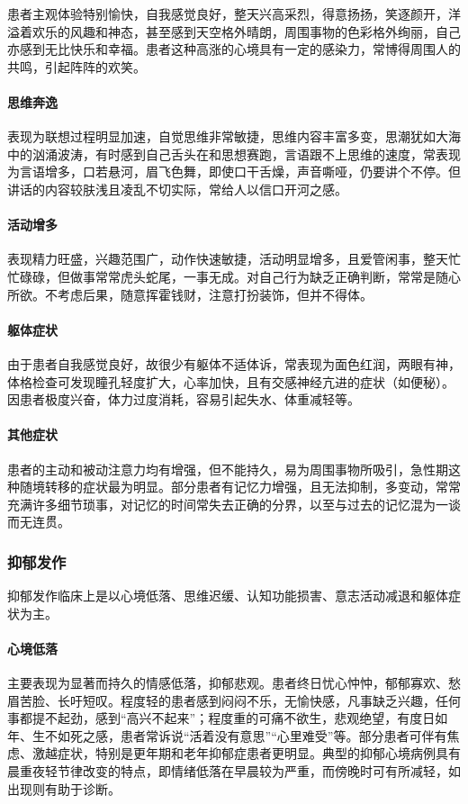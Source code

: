 患者主观体验特别愉快，自我感觉良好，整天兴高采烈，得意扬扬，笑逐颜开，洋溢着欢乐的风趣和神态，甚至感到天空格外晴朗，周围事物的色彩格外绚丽，自己亦感到无比快乐和幸福。患者这种高涨的心境具有一定的感染力，常博得周围人的共鸣，引起阵阵的欢笑。
\paragraph{思维奔逸}

表现为联想过程明显加速，自觉思维非常敏捷，思维内容丰富多变，思潮犹如大海中的汹涌波涛，有时感到自己舌头在和思想赛跑，言语跟不上思维的速度，常表现为言语增多，口若悬河，眉飞色舞，即使口干舌燥，声音嘶哑，仍要讲个不停。但讲话的内容较肤浅且凌乱不切实际，常给人以信口开河之感。
\paragraph{活动增多}

表现精力旺盛，兴趣范围广，动作快速敏捷，活动明显增多，且爱管闲事，整天忙忙碌碌，但做事常常虎头蛇尾，一事无成。对自己行为缺乏正确判断，常常是随心所欲。不考虑后果，随意挥霍钱财，注意打扮装饰，但并不得体。
\paragraph{躯体症状}

由于患者自我感觉良好，故很少有躯体不适体诉，常表现为面色红润，两眼有神，体格检查可发现瞳孔轻度扩大，心率加快，且有交感神经亢进的症状（如便秘）。因患者极度兴奋，体力过度消耗，容易引起失水、体重减轻等。
\paragraph{其他症状}

患者的主动和被动注意力均有增强，但不能持久，易为周围事物所吸引，急性期这种随境转移的症状最为明显。部分患者有记忆力增强，且无法抑制，多变动，常常充满许多细节琐事，对记忆的时间常失去正确的分界，以至与过去的记忆混为一谈而无连贯。

\subsubsection{抑郁发作}

抑郁发作临床上是以心境低落、思维迟缓、认知功能损害、意志活动减退和躯体症状为主。
\paragraph{心境低落}

主要表现为显著而持久的情感低落，抑郁悲观。患者终日忧心忡忡，郁郁寡欢、愁眉苦脸、长吁短叹。程度轻的患者感到闷闷不乐，无愉快感，凡事缺乏兴趣，任何事都提不起劲，感到“高兴不起来”；程度重的可痛不欲生，悲观绝望，有度日如年、生不如死之感，患者常诉说“活着没有意思”“心里难受”等。部分患者可伴有焦虑、激越症状，特别是更年期和老年抑郁症患者更明显。典型的抑郁心境病例具有晨重夜轻节律改变的特点，即情绪低落在早晨较为严重，而傍晚时可有所减轻，如出现则有助于诊断。
